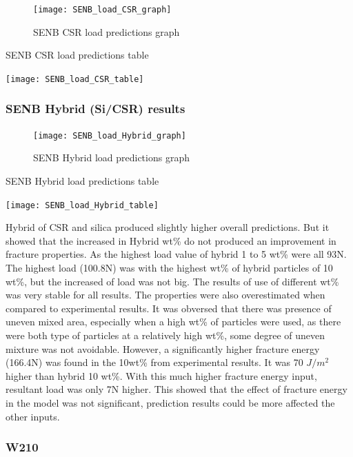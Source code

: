\documentclass[numbers=noendperiod,chapterprefix=on]{icldt} %
\begin{document}
{\begin{figure}[!hp]
\centering
\texttt{[image: SENB\_load\_CSR\_graph]}\label{SENB_load_CSR_graph}
\caption{SENB CSR load predictions graph}
\end{figure}


 \begin{table}
 \centering
 \caption{SENB CSR load predictions table}\label{SENB_load_CSR_table}
 \texttt{[image: SENB\_load\_CSR\_table]}
 \end{table}
 \FloatBarrier  
 
 \subsubsection{SENB Hybrid (Si/CSR) results}
 
 \begin{figure}[!hp]
 \centering
 \texttt{[image: SENB\_load\_Hybrid\_graph]}\label{SENB_load_Hybrid_graph}
 \caption{SENB Hybrid load predictions graph}
 \end{figure}
 \FloatBarrier
 
 \begin{table}
  \centering
  \caption{SENB Hybrid load predictions table}\label{SENB_load_Hybrid_table}
  \texttt{[image: SENB\_load\_Hybrid\_table]}
  \end{table}
  \FloatBarrier 
 
 Hybrid of CSR and silica produced slightly higher overall predictions. But it showed that the increased in Hybrid wt\% do not produced an improvement in fracture properties. As the highest load value of hybrid 1 to 5 wt\% were all 93N. The highest load (100.8N) was with the highest wt\% of hybrid particles of 10 wt\%, but the increased of load was not big. The results of use of different wt\% was very stable for all results. The properties were also overestimated when compared to experimental results. It was obversed that there was presence of uneven mixed area, especially when a high wt\% of particles were used, as there were both type of particles at a relatively high wt\%, some degree of uneven mixture was not avoidable. However, a significantly higher fracture energy (166.4N) was found in the 10wt\% from experimental results. It was 70 $J/m^{2}$ higher than hybrid 10 wt\%. With this much higher fracture energy input, resultant load was only 7N higher. 
 This showed that the effect of fracture energy in the model was not significant, prediction results could be more affected the other inputs.
 
 \subsubsection{W210}
 
}
\end{document}
